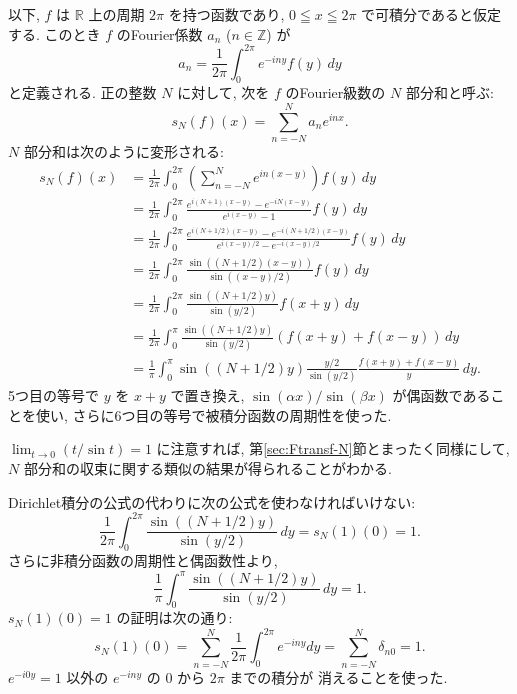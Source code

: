 \documentclass[12pt,twoside]{jarticle}
\newcommand\Z{{\mathbb Z}} %
\newcommand\R{{\mathbb R}} %
\theoremstyle{jplain}
\theoremstyle{jplain}
\theoremstyle{jplain}
\numberwithin{theorem}{section}
\numberwithin{equation}{section}
\numberwithin{figure}{section}
\numberwithin{table}{section}
\newcommand\secref[1]{第\ref{#1}節}
\begin{document}
以下, $f$ は $\R$ 上の周期 $2\pi$ を持つ函数であり,
$0\leqq x\leqq 2\pi$ で可積分であると仮定する.
このとき $f$ のFourier係数 $a_n$ ($n\in\Z$) が
\[
a_n = \frac{1}{2\pi}\int_0^{2\pi} e^{-iny}f(y)\,dy
\]
と定義される. 正の整数 $N$ に対して,
次を $f$ のFourier級数の $N$ 部分和と呼ぶ:
\[
s_N(f)(x) = \sum_{n=-N}^N a_n e^{inx}.
\]
$N$ 部分和は次のように変形される:
\begin{align*}
s_N(f)(x)
&=\frac{1}{2\pi}\int_0^{2\pi}
\left(\sum_{n=-N}^N e^{in(x-y)}\right) f(y)\,dy
\\ &
=\frac{1}{2\pi}\int_0^{2\pi}
\frac{e^{i(N+1)(x-y)}-e^{-iN(x-y)}}{e^{i(x-y)}-1} f(y)\,dy
\\ &
=\frac{1}{2\pi}\int_0^{2\pi}
\frac{e^{i(N+1/2)(x-y)}-e^{-i(N+1/2)(x-y)}}{e^{i(x-y)/2}-e^{-i(x-y)/2}} f(y)\,dy
\\ &
=\frac{1}{2\pi}\int_0^{2\pi}
\frac{\sin((N+1/2)(x-y))}{\sin((x-y)/2)} f(y)\,dy
\\ &
=\frac{1}{2\pi}\int_0^{2\pi}
\frac{\sin((N+1/2)y)}{\sin(y/2)}f(x+y)\,dy
\\ &
=\frac{1}{2\pi}\int_0^{\pi}
\frac{\sin((N+1/2)y)}{\sin(y/2)}(f(x+y)+f(x-y))\,dy
\\ &
=\frac{1}{\pi}\int_0^{\pi}
\sin((N+1/2)y)\frac{y/2}{\sin(y/2)}\frac{f(x+y)+f(x-y)}{y}\,dy.
\end{align*}
5つ目の等号で $y$ を $x+y$ で置き換え,
$\sin(\alpha x)/\sin(\beta x)$ が偶函数であることを使い,
さらに6つ目の等号で被積分函数の周期性を使った.

$\lim_{t\to 0}(t/\sin t)=1$ に注意すれば,
\secref{sec:Ftransf-N}とまったく同様にして,
$N$ 部分和の収束に関する類似の結果が得られることがわかる.


Dirichlet積分の公式の代わりに次の公式を使わなければいけない:
\[
\frac{1}{2\pi}\int_0^{2\pi}
\frac{\sin((N+1/2)y)}{\sin(y/2)}\,dy
= s_N(1)(0)=1.
\]
さらに非積分函数の周期性と偶函数性より,
\[
\frac{1}{\pi}\int_0^{\pi}\frac{\sin((N+1/2)y)}{\sin(y/2)}\,dy
= 1.
\]
$s_N(1)(0)=1$ の証明は次の通り:
\[
s_N(1)(0)
=\sum_{n=-N}^N \frac{1}{2\pi}\int_0^{2\pi}e^{-iny}dy
=\sum_{n=-N}^N \delta_{n0}
=1.
\]
$e^{-i0y}=1$ 以外の $e^{-iny}$ の $0$ から $2\pi$ までの積分が
消えることを使った.
\end{document}
